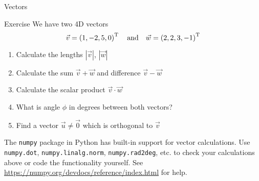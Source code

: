   \begin{frame}{Vectors}
    \begin{exampleblock}{Exercise}
      We have two 4D vectors
      \begin{equation*}
        \vec{v} = \left(1, -2, 5, 0\right)^{\text{T}}
        \quad\text{and}\quad
        \vec{w} = \left(2, 2, 3, -1\right)^{\text{T}}
      \end{equation*}
      \begin{enumerate}
        \item Calculate the lengths $|\vec{v}|$, $|\vec{w}|$
        \item Calculate the sum $\vec{v} + \vec{w}$ and difference $\vec{v} - \vec{w}$
        \item Calculate the scalar product $\vec{v}\cdot \vec{w}$
        \item What is angle $\phi$ in degrees between both vectors?
        \item Find a vector $\vec{u}\neq \vec{0}$ which is orthogonal to $\vec{v}$
      \end{enumerate}
      The \texttt{numpy} package in Python has built-in support for vector
      calculations.
      Use \texttt{numpy.dot}, \texttt{numpy.linalg.norm},
      \texttt{numpy.rad2deg}, etc. to check your calculations above or code the
      functionality yourself.
      See \url{https://numpy.org/devdocs/reference/index.html} for help.
    \end{exampleblock}
  \end{frame}

